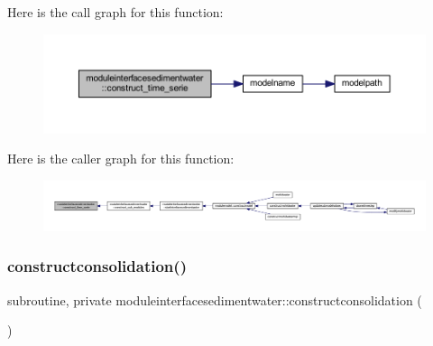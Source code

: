 Here is the call graph for this function\+:\nopagebreak
\begin{figure}[H]
\begin{center}
\leavevmode
\includegraphics[width=350pt]{namespacemoduleinterfacesedimentwater_ad93a2c6131aefc16d45e6f81ca87678e_cgraph}
\end{center}
\end{figure}
Here is the caller graph for this function\+:\nopagebreak
\begin{figure}[H]
\begin{center}
\leavevmode
\includegraphics[width=350pt]{namespacemoduleinterfacesedimentwater_ad93a2c6131aefc16d45e6f81ca87678e_icgraph}
\end{center}
\end{figure}
\mbox{\label{namespacemoduleinterfacesedimentwater_af0c8cd28e080ee63fe3573266a390d33}} 
\subsubsection{\texorpdfstring{constructconsolidation()}{constructconsolidation()}}
{\footnotesize\ttfamily subroutine, private moduleinterfacesedimentwater\+::constructconsolidation (\begin{DoxyParamCaption}{ }\end{DoxyParamCaption})\hspace{0.3cm}{\ttfamily [private]}}

